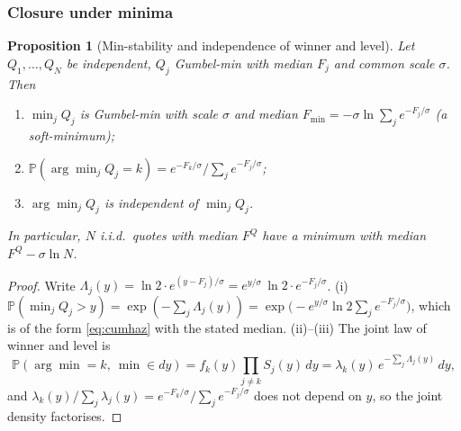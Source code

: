 \documentclass[11pt,a4paper]{article}
\newtheorem{proposition}{Proposition}
\theoremstyle{definition}
\theoremstyle{remark}
\newcommand{\Prob}{\mathbb{P}}
\begin{document}
\subsubsection{Closure under minima}
\begin{proposition}[Min-stability and independence of winner and level]\label{prop:minstable}
Let $Q_1,\dots,Q_N$ be independent, $Q_j$ Gumbel-min with median $F_j$ and common scale $\sigma$. Then
\begin{enumerate}[label=(\roman*),itemsep=1pt]
\item $\min_jQ_j$ is Gumbel-min with scale $\sigma$ and median $F_{\min}=-\sigma\ln\sum_j e^{-F_j/\sigma}$ (a soft-minimum);
\item $\Prob(\arg\min_jQ_j=k)=e^{-F_k/\sigma}\big/\sum_je^{-F_j/\sigma}$;
\item $\arg\min_jQ_j$ is independent of $\min_jQ_j$.
\end{enumerate}
In particular, $N$ i.i.d.\ quotes with median $F^Q$ have a minimum with median $F^Q-\sigma\ln N$.
\end{proposition}
\begin{proof}
Write $\Lambda_j(y)=\ln2\cdot e^{(y-F_j)/\sigma}=e^{y/\sigma}\,\ln2\cdot e^{-F_j/\sigma}$. (i) $\Prob(\min_jQ_j>y)=\exp(-\sum_j\Lambda_j(y))=\exp\bigl(-e^{y/\sigma}\ln2\sum_je^{-F_j/\sigma}\bigr)$, which is of the form \eqref{eq:cumhaz} with the stated median. (ii)--(iii) The joint law of winner and level is
\[
\Prob(\arg\min=k,\ \min\in dy)=f_k(y)\prod_{j\ne k}S_j(y)\,dy=\lambda_k(y)\,e^{-\sum_j\Lambda_j(y)}\,dy,
\]
and $\lambda_k(y)/\sum_j\lambda_j(y)=e^{-F_k/\sigma}/\sum_je^{-F_j/\sigma}$ does not depend on $y$, so the joint density factorises.
\end{proof}
\end{document}
